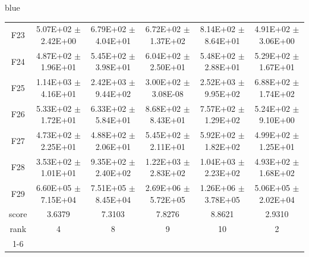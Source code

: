 \documentclass[journal, onecolumn]{IEEEtran}
\begin{document}
\begin{color}{blue}
\begin{table}[htbp!]
\begin{tabular}{c|ccccc}
			F23	 &	5.07E+02	$\pm$	2.42E+00		 &	6.79E+02	$\pm$	4.04E+01		 &	6.72E+02	$\pm$	1.37E+02		 &	8.14E+02	$\pm$	8.64E+01		 &	4.91E+02	$\pm$	3.06E+00	\\
			F24	 &	4.87E+02	$\pm$	1.96E+01		 &	5.45E+02	$\pm$	3.98E+01		 &	6.04E+02	$\pm$	2.50E+01		 &	5.48E+02	$\pm$	2.88E+01		 &	5.29E+02	$\pm$	1.67E+01	\\
			F25	 &	1.14E+03	$\pm$	4.16E+01		 &	2.42E+03	$\pm$	9.44E+02		 &	3.00E+02	$\pm$	3.08E-08		 &	2.52E+03	$\pm$	9.95E+02		 &	6.88E+02	$\pm$	1.74E+02	\\
			F26	 &	5.33E+02	$\pm$	1.72E+01		 &	6.33E+02	$\pm$	5.84E+01		 &	8.68E+02	$\pm$	8.43E+01		 &	7.57E+02	$\pm$	1.29E+02		 &	5.24E+02	$\pm$	9.10E+00	\\
			F27	 &	4.73E+02	$\pm$	2.25E+01		 &	4.88E+02	$\pm$	2.06E+01		 &	5.45E+02	$\pm$	2.11E+01		 &	5.92E+02	$\pm$	1.82E+02		 &	4.99E+02	$\pm$	1.25E+01	\\
			F28	 &	3.53E+02	$\pm$	1.01E+01		 &	9.35E+02	$\pm$	2.40E+02		 &	1.22E+03	$\pm$	2.83E+02		 &	1.04E+03	$\pm$	2.23E+02		 &	4.93E+02	$\pm$	1.68E+02	\\
			F29	 &	6.60E+05	$\pm$	7.15E+04		 &	7.51E+05	$\pm$	8.45E+04		 &	2.69E+06	$\pm$	5.72E+05		 &	1.26E+06	$\pm$	3.78E+05		 &	5.06E+05	$\pm$	2.02E+04	\\\hline
			score	 	 & 3.6379 & 7.3103 & 7.8276 & 8.8621 & 2.9310											\\												
			rank 		 & 4 & 8 & 9 & 10 & 2											\\	\cline{1-6}																
			
	\end{tabular}
\end{table}


\end{color}
\end{document}
